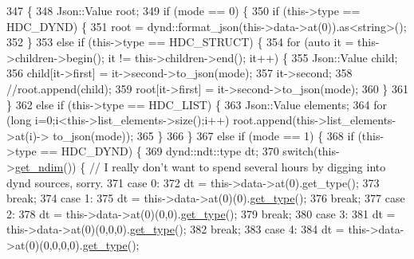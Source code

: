\begin{DoxyCode}
347                                \{
348     Json::Value root;
349     \textcolor{keywordflow}{if} (mode == 0) \{
350         \textcolor{keywordflow}{if} (this->type == HDC\_DYND) \{
351             root = dynd::format\_json(this->data->at(0)).as<string>();        
352         \}
353         \textcolor{keywordflow}{else} \textcolor{keywordflow}{if} (this->type == HDC\_STRUCT) \{
354             \textcolor{keywordflow}{for} (\textcolor{keyword}{auto} it = this->children->begin(); it != this->children->end(); it++) \{
355                 Json::Value child;
356                 child[it->first] = it->second->to\_json(mode);
357                 it->second;
358                 \textcolor{comment}{//root.append(child);}
359                 root[it->first] = it->second->to\_json(mode);
360             \}
361         \}
362         \textcolor{keywordflow}{else} \textcolor{keywordflow}{if} (this->type == HDC\_LIST) \{
363             Json::Value elements;
364             \textcolor{keywordflow}{for} (\textcolor{keywordtype}{long} i=0;i<this->list\_elements->size();i++) root.append(this->list\_elements->at(i)->
      to\_json(mode));        
365         \}
366     \}
367     \textcolor{keywordflow}{else} \textcolor{keywordflow}{if} (mode == 1) \{
368             \textcolor{keywordflow}{if} (this->type == HDC\_DYND) \{
369             dynd::ndt::type dt;
370             \textcolor{keywordflow}{switch}(this->\hyperlink{a00003_a759758dd2b6b8986341753e94ad12252}{get\_ndim}()) \{ \textcolor{comment}{// I really don't want to spend several hours by digging
       into dynd sources, sorry.}
371                 \textcolor{keywordflow}{case} 0:
372                     dt = this->data->at(0).get\_type();
373                     \textcolor{keywordflow}{break};
374                 \textcolor{keywordflow}{case} 1:
375                     dt = this->data->at(0)(0).\hyperlink{a00003_ac12e6d9074533304ea4d3eb08623d774}{get\_type}();
376                     \textcolor{keywordflow}{break};
377                 \textcolor{keywordflow}{case} 2:
378                     dt = this->data->at(0)(0,0).\hyperlink{a00003_ac12e6d9074533304ea4d3eb08623d774}{get\_type}();
379                     \textcolor{keywordflow}{break};
380                 \textcolor{keywordflow}{case} 3:
381                     dt = this->data->at(0)(0,0,0).\hyperlink{a00003_ac12e6d9074533304ea4d3eb08623d774}{get\_type}();
382                     \textcolor{keywordflow}{break};
383                 \textcolor{keywordflow}{case} 4:
384                     dt = this->data->at(0)(0,0,0,0).\hyperlink{a00003_ac12e6d9074533304ea4d3eb08623d774}{get\_type}();

\end{DoxyCode}
